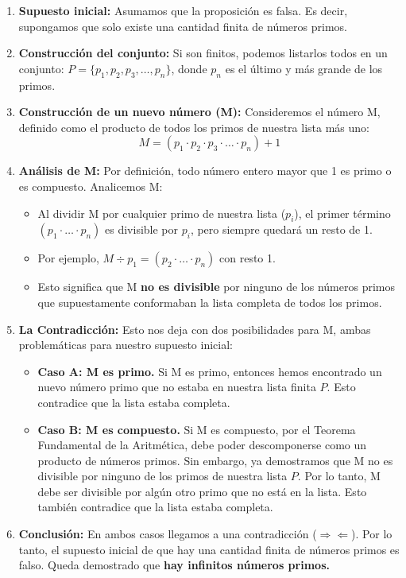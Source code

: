 \documentclass[12pt, letterpaper]{article}
\begin{document}
\begin{enumerate}
	\item \textbf{Supuesto inicial:} Asumamos que la proposición es falsa. Es decir, supongamos que solo existe una cantidad finita de números primos.
	\item \textbf{Construcción del conjunto:} Si son finitos, podemos listarlos todos en un conjunto: $P = \{p_1, p_2, p_3, \dots, p_n\}$, donde $p_n$ es el último y más grande de los primos.
	\item \textbf{Construcción de un nuevo número (M):} Consideremos el número M, definido como el producto de todos los primos de nuestra lista más uno:
	      \[ M = (p_1 \cdot p_2 \cdot p_3 \cdot \dots \cdot p_n) + 1 \]
	\item \textbf{Análisis de M:} Por definición, todo número entero mayor que 1 es primo o es compuesto. Analicemos M:
	      \begin{itemize}
		      \item Al dividir M por cualquier primo de nuestra lista ($p_i$), el primer término $(p_1 \cdot \dots \cdot p_n)$ es divisible por $p_i$, pero siempre quedará un resto de 1.
		      \item Por ejemplo, $M \div p_1 = (p_2 \cdot \dots \cdot p_n)$ con resto 1.
		      \item Esto significa que M \textbf{no es divisible} por ninguno de los números primos que supuestamente conformaban la lista completa de todos los primos.
	      \end{itemize}
	\item \textbf{La Contradicción:} Esto nos deja con dos posibilidades para M, ambas problemáticas para nuestro supuesto inicial:
	      \begin{itemize}
		      \item \textbf{Caso A: M es primo.} Si M es primo, entonces hemos encontrado un nuevo número primo que no estaba en nuestra lista finita $P$. Esto contradice que la lista estaba completa.
		      \item \textbf{Caso B: M es compuesto.} Si M es compuesto, por el Teorema Fundamental de la Aritmética, debe poder descomponerse como un producto de números primos. Sin embargo, ya demostramos que M no es divisible por ninguno de los primos de nuestra lista $P$. Por lo tanto, M debe ser divisible por algún otro primo que no está en la lista. Esto también contradice que la lista estaba completa.
	      \end{itemize}
	\item \textbf{Conclusión:} En ambos casos llegamos a una contradicción ($\Rightarrow\Leftarrow$). Por lo tanto, el supuesto inicial de que hay una cantidad finita de números primos es falso. Queda demostrado que \textbf{hay infinitos números primos.}
\end{enumerate}
\end{document}
